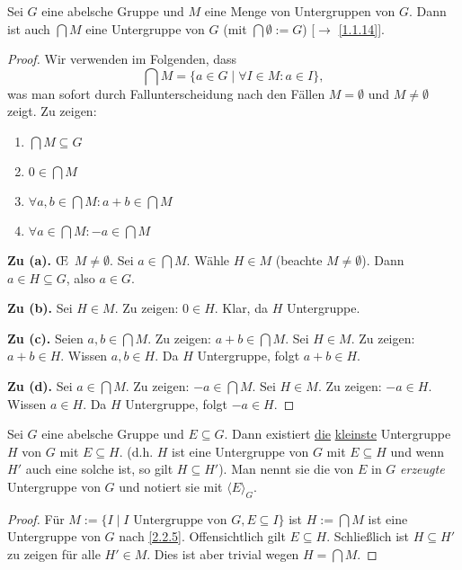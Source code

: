 \documentclass[../../main.tex]{subfiles}
\begin{document}
\begin{pro}\label{2.2.5}
Sei $G$ eine abelsche Gruppe und $M$ eine Menge von Untergruppen von $G$. Dann ist auch $\bigcap M$ eine Untergruppe von $G$ (mit $\bigcap\emptyset:= G$) [$\to$ \ref{1.1.14}].
\end{pro}
\begin{proof}
Wir verwenden im Folgenden, dass
\[\bigcap M=\{a\in G\mid\forall I\in M:a\in I\},\]
was man sofort durch Fallunterscheidung nach den Fällen $M=\emptyset$ und $M\ne\emptyset$ zeigt.
Zu zeigen:
\begin{enumerate}[\normalfont(a)]
\item $\bigcap M\subseteq G$
\item $0\in \bigcap M$
\item $\forall a,b \in \bigcap M:a+b\in\bigcap M$
\item $\forall a\in\bigcap M:-a\in\bigcap M$
\end{enumerate}

\textbf{Zu (a).} \OE\ $M\neq \emptyset$. Sei $a\in\bigcap M$. Wähle $H\in M$ (beachte $M\ne\emptyset$). Dann
$a\in H\subseteq G$, also $a\in G$.

\textbf{Zu (b).} Sei $H\in M$. Zu zeigen: $0\in H$. Klar, da $H$ Untergruppe.

\textbf{Zu (c).} Seien $a,b\in \bigcap M$. Zu zeigen: $a+b\in\bigcap M$. Sei $H\in M$. Zu zeigen: $a+b\in H$.
Wissen $a,b\in H$. Da $H$ Untergruppe, folgt $a+b\in H$.

\textbf{Zu (d).} Sei $a\in\bigcap M$. Zu zeigen: $-a\in\bigcap M$. Sei $H\in M$. Zu zeigen: $-a\in H$. Wissen $a\in H$. Da $H$ Untergruppe, folgt $-a\in H$.
\end{proof}

\begin{satdef}\label{2.2.6}
Sei $G$ eine abelsche Gruppe und $E\subseteq G$. Dann existiert \underline{\underline{die}} \underline{kleinste}
Untergruppe $H$ von $G$ mit $E\subseteq H$. (d.h. $H$ ist eine Untergruppe von $G$ mit $E\subseteq H$ und wenn
$H'$ auch eine solche ist, so gilt $H\subseteq H'$). Man nennt sie die von $E$ in $G$ \emph{erzeugte} Untergruppe von $G$ und notiert sie mit $\langle E\rangle_G$.
\end{satdef}
\begin{proof}
Für $M:=\{I\mid I\text{ Untergruppe von }G,E\subseteq I\}$ ist
$H:=\bigcap M$ ist eine Untergruppe von $G$ nach \ref{2.2.5}. Offensichtlich gilt $E\subseteq H$.
Schließlich ist $H\subseteq H'$ zu zeigen für alle $H'\in M$. Dies ist aber trivial wegen $H=\bigcap M$.
\end{proof}
\end{document}
